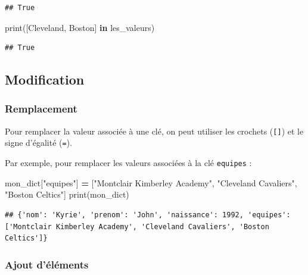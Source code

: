 \documentclass[
  12pt,
]{book}
\newenvironment{Shaded}{\begin{snugshade}}{\end{snugshade}}
\newcommand{\BuiltInTok}[1]{#1}
\newcommand{\KeywordTok}[1]{\textcolor[rgb]{0.13,0.29,0.53}{\textbf{#1}}}
\newcommand{\NormalTok}[1]{#1}
\newcommand{\OperatorTok}[1]{\textcolor[rgb]{0.81,0.36,0.00}{\textbf{#1}}}
\newcommand{\StringTok}[1]{\textcolor[rgb]{0.31,0.60,0.02}{#1}}
\numberwithin{equation}{section}
\numberwithin{countremarque}{section}
\begin{document}
\begin{lstlisting}
## True
\end{lstlisting}

\begin{Shaded}
\begin{Highlighting}[]
\BuiltInTok{print}\NormalTok{([}\StringTok{\textquotesingle{}Cleveland\textquotesingle{}}\NormalTok{, }\StringTok{\textquotesingle{}Boston\textquotesingle{}}\NormalTok{] }\KeywordTok{in}\NormalTok{ les\_valeurs)}
\end{Highlighting}
\end{Shaded}

\begin{lstlisting}
## True
\end{lstlisting}

\subsection{Modification}\label{modification-2}

\subsubsection{Remplacement}\label{remplacement-1}

Pour remplacer la valeur associée à une clé, on peut utiliser les crochets (\texttt{{[}{]}}) et le signe d'égalité (\texttt{=}).

Par exemple, pour remplacer les valeurs associées à la clé \texttt{equipes} :

\begin{Shaded}
\begin{Highlighting}[]
\NormalTok{mon\_dict[}\StringTok{"equipes"}\NormalTok{] }\OperatorTok{=}\NormalTok{ [}\StringTok{"Montclair Kimberley Academy"}\NormalTok{,}
  \StringTok{"Cleveland Cavaliers"}\NormalTok{, }\StringTok{"Boston Celtics"}\NormalTok{]}
\BuiltInTok{print}\NormalTok{(mon\_dict)}
\end{Highlighting}
\end{Shaded}

\begin{lstlisting}
## {'nom': 'Kyrie', 'prenom': 'John', 'naissance': 1992, 'equipes': ['Montclair Kimberley Academy', 'Cleveland Cavaliers', 'Boston Celtics']}
\end{lstlisting}

\subsubsection{Ajout d'éléments}\label{ajout-duxe9luxe9ments-1}
\end{document}
